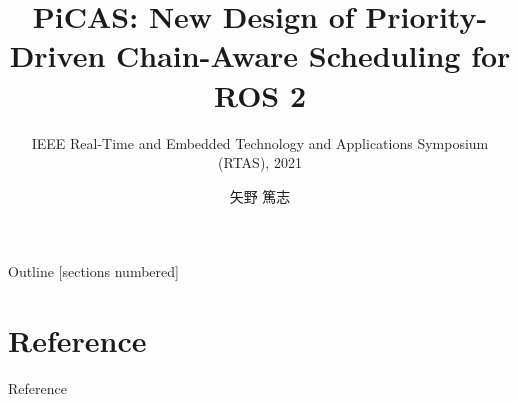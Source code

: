 \newcommand{\beamerDir}[0]{/mnt/c/Users/atsushi/Documents/workspace/env/Beamer/beamer/beamer/}





\newcommand{\forme}[1]{}


\title{PiCAS: New Design of Priority-Driven Chain-Aware Scheduling for ROS 2}
\subtitle{IEEE Real-Time and Embedded Technology and Applications Symposium (RTAS), 2021}
\author{矢野 篤志}




\maketitle



\begin{frame}{Outline}
    [sections numbered]
    \tiny\tableofcontents[hideallsubsections]
\end{frame}





\forme{}





\lastpage

\section*{Reference}
\begin{frame}[allowframebreaks]{Reference}
    \beamertemplatetextbibitems
    
    
\end{frame}


